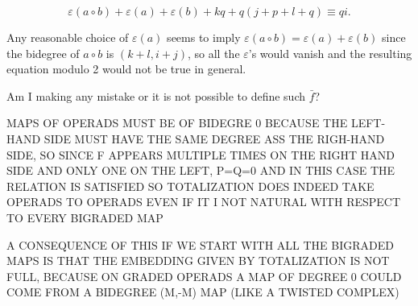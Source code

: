 \documentclass[twoside]{article}
\begin{document}
$$\varepsilon(a\circ b)+\varepsilon(a)+\varepsilon(b)+kq+q(j+p+l+q)\equiv qi.$$

Any reasonable choice of $\varepsilon(a)$ seems to imply $\varepsilon(a\circ b)=\varepsilon(a)+\varepsilon(b)$ since the bidegree of $a\circ b$ is $(k+l,i+j)$, so all the $\varepsilon$'s would vanish and the resulting equation modulo 2 would not be true in general.

Am I making any mistake or it is not possible to define such $\bar{f}$?

MAPS OF OPERADS MUST BE OF BIDEGRE 0 BECAUSE THE LEFT-HAND SIDE MUST HAVE THE SAME DEGREE ASS THE RIGH-HAND SIDE, SO SINCE F APPEARS MULTIPLE TIMES ON THE RIGHT HAND SIDE AND ONLY ONE ON THE LEFT, P=Q=0 AND IN THIS CASE THE RELATION IS SATISFIED SO TOTALIZATION DOES INDEED TAKE OPERADS TO OPERADS EVEN IF IT I NOT NATURAL WITH RESPECT TO EVERY BIGRADED MAP

A CONSEQUENCE OF THIS IF WE START WITH ALL THE BIGRADED MAPS IS THAT THE EMBEDDING GIVEN BY TOTALIZATION IS NOT FULL, BECAUSE ON GRADED OPERADS A MAP OF DEGREE 0 COULD COME FROM A BIDEGREE (M,-M) MAP (LIKE A TWISTED COMPLEX)
\end{document}
